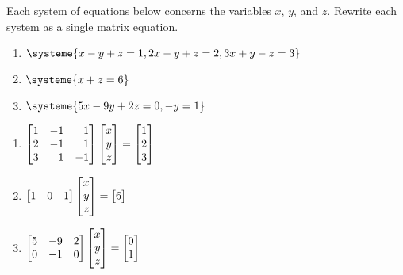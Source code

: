 \begin{exercises}
	\begin{problist}

		\prob Each system of equations below concerns the variables $x$, $y$, and $z$.
		Rewrite each system as a single matrix equation.
		\begin{enumerate}
			\item $\systeme{x-y+z=1,2x-y+z=2,3x+y-z=3}$
			\item $\systeme{x+z=6}$
			\item $\systeme{5x-9y+2z=0,-y=1}$
		\end{enumerate}
		\begin{solution}
			\begin{enumerate}
				\item $\mat{1&-1&1\\2&-1&1\\3&1&-1}\mat{x\\y\\z} = \mat{1\\2\\3}$
				\item $\mat{1&0&1}\mat{x\\y\\z} = \mat{6}$
				\item $\mat{5&-9&2\\0&-1&0}\mat{x\\y\\z} = \mat{0\\1}$
			\end{enumerate}
		\end{solution}


\end{problist}
\end{exercises}
